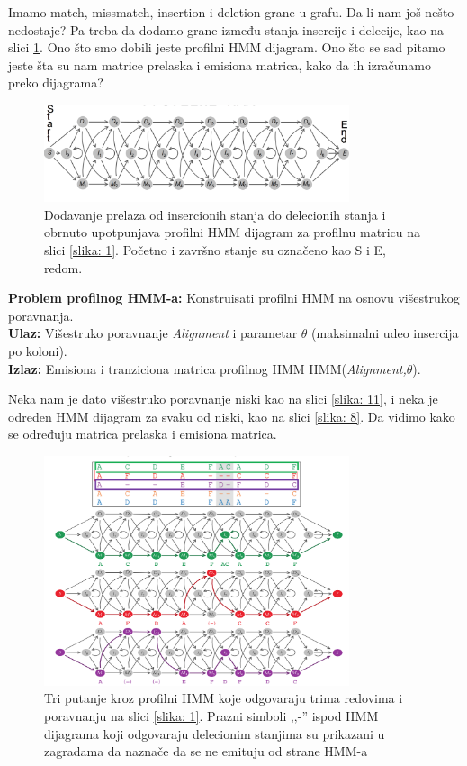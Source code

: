Imamo match, missmatch, insertion i deletion grane u grafu. Da li nam još nešto nedostaje? Pa treba da dodamo grane između stanja insercije i delecije, kao na slici \ref{slika: 6}. 
Ono što smo dobili jeste profilni HMM dijagram. Ono što se sad pitamo jeste šta su nam matrice prelaska i emisiona matrica, kako da ih izračunamo preko dijagrama?

\begin{figure}[H]
\centering
\includegraphics[width=0.8\textwidth]{poglavlja/10/slike/slika6.png}
\caption{Dodavanje prelaza od insercionih stanja do delecionih stanja i obrnuto upotpunjava profilni HMM dijagram za profilnu matricu na slici \ref{slika: 1}. Početno i završno stanje su označeno kao S i E, redom.}
\label{slika: 6}
\end{figure}


\begin{tcolorbox}\textbf{Problem profilnog HMM-a:} 
	Konstruisati profilni HMM na osnovu višestrukog poravnanja.\\
	\textbf{Ulaz:} Višestruko poravnanje \textit{Alignment} i parametar $\theta$
(maksimalni udeo insercija po koloni). \\
	\textbf{Izlaz:} Emisiona i tranziciona matrica profilnog HMM HMM(\textit{Alignment,$\theta$}). 
\end{tcolorbox}


Neka nam je dato višestruko poravnanje niski kao na slici \ref{slika: 11}, i neka je određen HMM dijagram za svaku od niski, kao na slici \ref{slika: 8}. Da vidimo kako se određuju matrica prelaska i emisiona matrica.

\iffalse 
\begin{figure}[h]
\centering
\includegraphics[width=0.8\textwidth]{poglavlja/10/slike/slika7.png}
\caption{Tri putanje kroz profilni HMM koje odgovaraju trima redovima i poravnanju na slici \ref{slika: 1}. Prazni simboli ‚‚-'' ispod HMM dijagrama koji odgovaraju delecionim stanjima su prikazani u zagradama da naznače da se ne emituju od strane HMM-a}
\label{slika: 7}
\end{figure}

